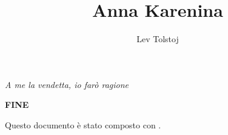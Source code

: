 \documentclass{scrbook}
\title{Anna Karenina}
\author{Lev Tolstoj}
\date{}
\begin{document}

\begin{titlepage}
\begin{center}
\pagecolor{rosso}\afterpage{\nopagecolor}
\color{panna}
{\sffamily
\vspace*{\fill}
\newline
\vspace*{5pt}
}
\color{giallo}
\vspace*{5pt}
\end{center}
\end{titlepage}
\restoregeometry

\cleardoublepage

\pagestyle{empty}
\vspace*{\fill}
\begin{flushright}\emph{A me la vendetta, io farò ragione}\end{flushright}
\vspace*{\fill}
\cleardoublepage
\thispagestyle{empty}
\tableofcontents



%








\vspace*{\fill}
\begin{center}\sffamily\textbf{FINE}\end{center}
\vspace*{\fill}


\cleardoublepage

\vspace*{\fill}
\begin{center}\sffamily Questo documento è stato composto con .\end{center}

\cleardoublepage

\pagecolor{rosso}\null\thispagestyle{empty}

\end{document}
